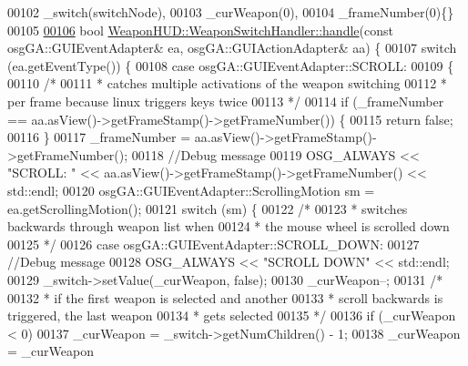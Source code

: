 \begin{DoxyCode}
00102         \_switch(switchNode),
00103         \_curWeapon(0),
00104         \_frameNumber(0)\{\}
00105 
\hypertarget{_weapon_h_u_d_8cpp_source_l00106}{}\hyperlink{classbrtr_1_1_weapon_h_u_d_1_1_weapon_switch_handler_ad3bd49035273e857144c1ad4927a22df}{00106}     \textcolor{keywordtype}{bool} \hyperlink{classbrtr_1_1_weapon_h_u_d_1_1_weapon_switch_handler_ad3bd49035273e857144c1ad4927a22df}{WeaponHUD::WeaponSwitchHandler::handle}(\textcolor{keyword}{const} 
      osgGA::GUIEventAdapter& ea, osgGA::GUIActionAdapter& aa) \{
00107         \textcolor{keywordflow}{switch} (ea.getEventType()) \{
00108         \textcolor{keywordflow}{case} osgGA::GUIEventAdapter::SCROLL:
00109         \{
00110       \textcolor{comment}{/*}
00111 \textcolor{comment}{       * catches multiple activations of the weapon switching}
00112 \textcolor{comment}{       * per frame because linux triggers keys twice}
00113 \textcolor{comment}{       */}
00114             \textcolor{keywordflow}{if} (\_frameNumber == aa.asView()->getFrameStamp()->getFrameNumber()) \{
00115                 \textcolor{keywordflow}{return} \textcolor{keyword}{false};
00116             \}
00117             \_frameNumber = aa.asView()->getFrameStamp()->getFrameNumber();
00118         \textcolor{comment}{//Debug message}
00119             OSG\_ALWAYS << \textcolor{stringliteral}{"SCROLL: "} << aa.asView()->getFrameStamp()->getFrameNumber() << std::endl;
00120             osgGA::GUIEventAdapter::ScrollingMotion sm = ea.getScrollingMotion();
00121             \textcolor{keywordflow}{switch} (sm) \{
00122             \textcolor{comment}{/*}
00123 \textcolor{comment}{         * switches backwards through weapon list when}
00124 \textcolor{comment}{         * the mouse wheel is scrolled down}
00125 \textcolor{comment}{         */}
00126             \textcolor{keywordflow}{case} osgGA::GUIEventAdapter::SCROLL\_DOWN:
00127         \textcolor{comment}{//Debug message}
00128           OSG\_ALWAYS << \textcolor{stringliteral}{"SCROLL DOWN"} << std::endl;
00129         \_switch->setValue(\_curWeapon, \textcolor{keyword}{false});
00130                 \_curWeapon--;
00131                 \textcolor{comment}{/*}
00132 \textcolor{comment}{         * if the first weapon is selected and another}
00133 \textcolor{comment}{         * scroll backwards is triggered, the last weapon}
00134 \textcolor{comment}{         * gets selected}
00135 \textcolor{comment}{         */}
00136         \textcolor{keywordflow}{if} (\_curWeapon < 0)
00137                     \_curWeapon = \_switch->getNumChildren() - 1;
00138                 \_curWeapon = \_curWeapon %

\end{DoxyCode}
